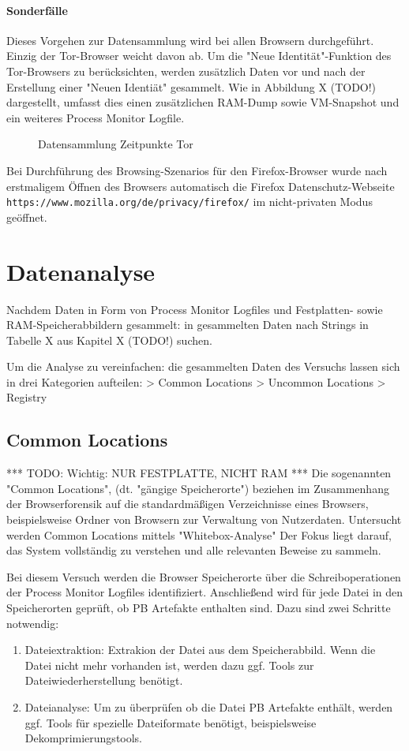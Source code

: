 \paragraph*{Sonderfälle}
Dieses Vorgehen zur Datensammlung wird bei allen Browsern durchgeführt. Einzig der Tor-Browser weicht davon ab. Um die "Neue Identität"-Funktion des Tor-Browsers zu berücksichten, werden zusätzlich Daten vor und nach der Erstellung einer "Neuen Identiät" gesammelt. Wie in Abbildung X (TODO!) dargestellt, umfasst dies einen zusätzlichen RAM-Dump sowie VM-Snapshot und ein weiteres Process Monitor Logfile.
\begin{figure}[h!]
	\centering
	\small
	\centerline{\resizebox{\linewidth}{!}{}}
	\caption{Datensammlung Zeitpunkte Tor}
	\label{fig:jes}
\end{figure}	
Bei Durchführung des Browsing-Szenarios für den Firefox-Browser wurde nach erstmaligem Öffnen des Browsers automatisch die Firefox Datenschutz-Webseite \texttt{https://www.mozilla.org/de/privacy/firefox/} im nicht-privaten Modus geöffnet. 

\section{Datenanalyse}
\label{section:methodik-datenanalyse}
Nachdem Daten in Form von Process Monitor Logfiles und Festplatten- sowie RAM-Speicherabbildern gesammelt: in gesammelten Daten nach Strings in Tabelle X aus Kapitel X (TODO!) suchen. 

Um die Analyse zu vereinfachen: die gesammelten Daten des Versuchs lassen sich in drei Kategorien aufteilen:
> Common Locations
> Uncommon Locations	
> Registry

\subsection{Common Locations}
\label{subsection:methodik-datenanalyse-commonlocations}
*** TODO: Wichtig: NUR FESTPLATTE, NICHT RAM ***
Die sogenannten "Common Locations", (dt. "gängige Speicherorte") beziehen im Zusammenhang der Browserforensik auf die standardmäßigen Verzeichnisse eines Browsers, beispielsweise Ordner von Browsern zur Verwaltung von Nutzerdaten.
Untersucht werden Common Locations mittels "Whitebox-Analyse" \cite{Bonetti.2014}
Der Fokus liegt darauf, das System vollständig zu verstehen und alle relevanten Beweise zu sammeln.

Bei diesem Versuch werden die Browser Speicherorte über die Schreiboperationen der Process Monitor Logfiles identifiziert.
Anschließend wird für jede Datei in den Speicherorten geprüft, ob PB Artefakte enthalten sind.
Dazu sind zwei Schritte notwendig:
\begin{enumerate}
\item Dateiextraktion: Extrakion der Datei aus dem Speicherabbild. Wenn die Datei nicht mehr vorhanden ist, werden dazu ggf. Tools zur Dateiwiederherstellung benötigt.
\item Dateianalyse: Um zu überprüfen ob die Datei PB Artefakte enthält, werden ggf. Tools für spezielle Dateiformate benötigt, beispielsweise Dekomprimierungstools.
\end{enumerate}

